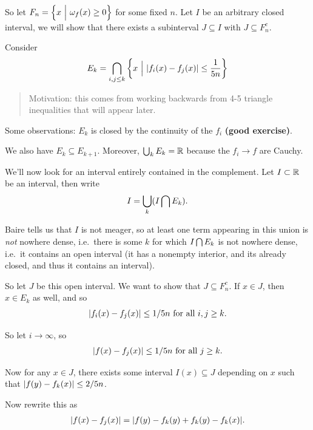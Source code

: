 So let \(F_n = \left\{{x {~\mathrel{\Big|}~} \omega_f(x) \geq 0}\right\}\) for some fixed
\(n\). Let \(I\) be an arbitrary closed interval, we will show that
there exists a subinterval \(J \subseteq I\) with \(J \subseteq F_n^c\).

Consider
\begin{align*}
E_k = \bigcap_{i, j \leq k} \left\{{x {~\mathrel{\Big|}~} {\left\lvert {f_i(x) - f_j(x)} \right\rvert} \leq \frac 1 {5n}}\right\}
\end{align*}

\begin{quote}
Motivation: this comes from working backwards from 4-5 triangle
inequalities that will appear later.
\end{quote}

Some observations: \(E_k\) is closed by the continuity of the \(f_i\)
\textbf{(good exercise)}.

We also have \(E_k \subseteq E_{k+1}\). Moreover, \(\bigcup_k E_k = {\mathbb{R}}\)
because the \(f_i \to f\) are Cauchy.

We'll now look for an interval entirely contained in the complement. Let
\(I \subset {\mathbb{R}}\) be an interval, then write
\begin{align*}
I = \bigcup_k (I\bigcap E_k)
.\end{align*}

Baire tells us that \(I\) is not meager, so at least one term appearing
in this union is \emph{not} nowhere dense, i.e.~there is some \(k\) for
which \(I \bigcap E_k\) is not nowhere dense, i.e.~it contains an
open interval (it has a nonempty interior, and its already closed, and
thus it contains an interval).

So let \(J\) be this open interval. We want to show that
\(J \subseteq F_n^c\). If \(x\in J\), then \(x\in E_k\) as well, and so
\begin{align*}
{\left\lvert {f_i(x) - f_j(x)} \right\rvert} \leq 1/5n \text{ for all } i,j \geq k
.\end{align*}

So let \(i\to \infty\), so
\begin{align*}
{\left\lvert {f(x) - f_j(x)} \right\rvert} \leq 1/5n \text{ for all } j\geq k
.\end{align*}

Now for any \(x\in J\), there exists some interval \(I(x) \subseteq J\)
depending on \(x\) such that \({\left\lvert {f(y) - f_k(x)} \right\rvert} \leq 2/5n\).

Now rewrite this as
\begin{align*}
{\left\lvert {f(x) - f_j(x)} \right\rvert} = {\left\lvert {f(y) - f_k(y) + f_k(y) - f_k(x)} \right\rvert}
.\end{align*}

